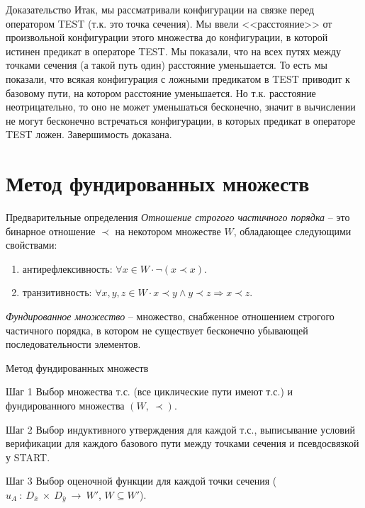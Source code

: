 \documentclass[hyperref={unicode=true}]{beamer}
\begin{document}
    \begin{frame}{Доказательство}
    Итак, мы рассматривали конфигурации на связке перед оператором TEST (т.к. это точка сечения). Мы ввели <<расстояние>> от произвольной конфигурации этого множества до конфигурации, в которой истинен предикат в операторе TEST. Мы показали, что на всех путях между точками сечения (а такой путь один) расстояние уменьшается. То есть мы показали, что всякая конфигурация с ложными предикатом в TEST приводит к базовому пути, на котором расстояние уменьшается. Но т.к. расстояние неотрицательно, то оно не может уменьшаться бесконечно, значит в вычислении не могут бесконечно встречаться конфигурации, в которых предикат в операторе TEST ложен. Завершимость доказана.
    \end{frame}

    \section{Метод фундированных множеств}

    \begin{frame}{Предварительные определения}
	\emph{Отношение строгого частичного порядка} -- это бинарное отношение $\prec$ на некотором множестве $W$, обладающее следующими свойствами:
    \begin{enumerate}
    \item антирефлексивность: $\forall x \in W \cdot \neg (x \prec x)$.
    \item транзитивность: $\forall x, y, z \in W \cdot x \prec y \land y \prec z \Rightarrow x \prec z$.
    \end{enumerate}

    \emph{Фундированное множество} -- множество, снабженное отношением строгого частичного порядка, в котором не существует бесконечно убывающей последовательности элементов.
    \end{frame}

	\begin{frame}{Метод фундированных множеств}

    \begin{block}{Шаг 1}
	Выбор множества т.с. (все циклические пути имеют т.с.) и фундированного множества $(W,~\prec)$.
	\end{block}
	\begin{block}{Шаг 2}
	Выбор индуктивного утверждения для каждой т.с., выписывание условий верификации для каждого
	базового пути между точками сечения и псевдосвязкой у START.
	\end{block}
	\begin{block}{Шаг 3}
	Выбор оценочной функции для каждой точки сечения ($u_A~:~D_{\bar{x}}~\times~D_{\bar{y}}~\rightarrow~W'$, $W \subseteq W'$).
	\end{block}
	\end{frame}
\end{document}
